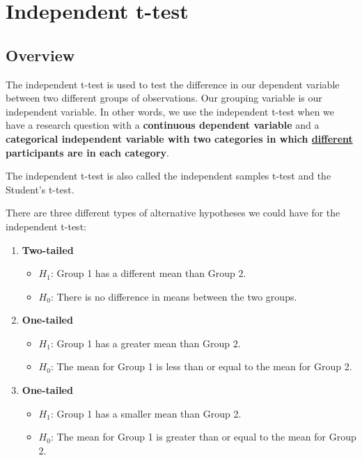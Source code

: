 \documentclass[
]{book}
\providecommand{\tightlist}{%
  \setlength{\itemsep}{0pt}\setlength{\parskip}{0pt}}
\begin{document}
\hypertarget{independent-t-test-1}{%
\chapter{Independent t-test}\label{independent-t-test-1}}

\hypertarget{overview}{%
\section{Overview}\label{overview}}

The independent t-test is used to test the difference in our dependent variable between two different groups of observations. Our grouping variable is our independent variable. In other words, we use the independent t-test when we have a research question with a \textbf{continuous dependent variable} and a \textbf{categorical independent variable with two categories in which \underline{different} participants are in each category}.

The independent t-test is also called the independent samples t-test and the Student's t-test.

There are three different types of alternative hypotheses we could have for the independent t-test:

\begin{enumerate}
\def\labelenumi{\arabic{enumi}.}
\item
  \textbf{Two-tailed}

  \begin{itemize}
  \tightlist
  \item
    \(H_1\): Group 1 has a different mean than Group 2.
  \item
    \(H_0\): There is no difference in means between the two groups.
  \end{itemize}
\item
  \textbf{One-tailed}

  \begin{itemize}
  \tightlist
  \item
    \(H_1\): Group 1 has a greater mean than Group 2.
  \item
    \(H_0\): The mean for Group 1 is less than or equal to the mean for Group 2.
  \end{itemize}
\item
  \textbf{One-tailed}

  \begin{itemize}
  \tightlist
  \item
    \(H_1\): Group 1 has a smaller mean than Group 2.
  \item
    \(H_0\): The mean for Group 1 is greater than or equal to the mean for Group 2.
  \end{itemize}
\end{enumerate}
\end{document}
